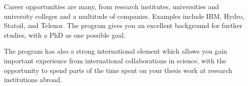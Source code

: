 \documentclass[%
twoside,                 %
final,                   %
10pt]{article}
\begin{document}
Career opportunities are many, from research institutes, universities
and university colleges and a multitude of companies. Examples
include IBM, Hydro, Statoil, and Telenor.  The program gives you an
excellent background for further studies, with a PhD as one possible
goal.

The program has also a strong international element which allows you
gain important experience from international collaborations in
science, with the opportunity to spend parts of the time spent on your
thesis work at research institutions abroad.







\printindex
\end{document}
